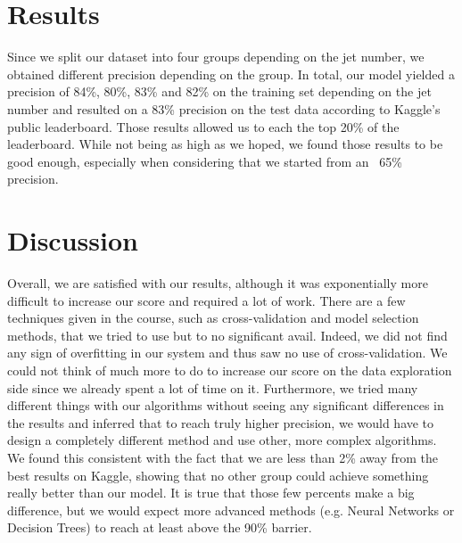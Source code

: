 \documentclass[10pt,conference,compsocconf]{IEEEtran}
\begin{document}
\section{Results}
 Since we split our dataset into four groups depending on the jet number, we obtained different precision depending on the group. In total, our model yielded a precision of 84\%, 80\%, 83\% and 82\% on the training set depending on the jet number and resulted on a 83\% precision on the test data according to Kaggle's public leaderboard. Those results allowed us to each the top 20\% of the leaderboard. While not being as high as we hoped, we found those results to be good enough, especially when considering that we started from an ~65\% precision.

\section{Discussion}
Overall, we are satisfied with our results, although it was exponentially more difficult to increase our score and required a lot of work. There are a few techniques given in the course, such as cross-validation and model selection methods, that we tried to use but to no significant avail. Indeed, we did not find any sign of overfitting in our system and thus saw no use of cross-validation.
We could not think of much more to do to increase our score on the data exploration side since we already spent a lot of time on it. Furthermore, we tried many different things with our algorithms without seeing any significant differences in the results and inferred that to reach truly higher precision, we would have to design a completely different method and use other, more complex algorithms. We found this consistent with the fact that we are less than 2\% away from the best results on Kaggle, showing that no other group could achieve something really better than our model. It is true that those few percents make a big difference, but we would expect more advanced methods (e.g. Neural Networks or Decision Trees) to reach at least above the 90\% barrier. 





\end{document}
